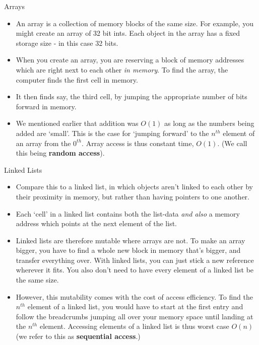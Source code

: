 \documentclass{beamer}
\begin{document}
\begin{frame}{Arrays}
    \begin{itemize}
    \item An array is a collection of memory blocks of the same size. For example, you might create an array of 32 bit ints. Each object in the array has a fixed storage size - in this case 32 bits.
    \pause 
    \item When you create an array, you are reserving a block of memory addresses which are right next to each other \emph{in memory}. To find the array, the computer finds the first cell in memory.
    \item It then finds say, the third cell, by jumping the appropriate number of bits forward in memory.
    \pause   
    \item We mentioned earlier that addition was $O(1)$ as long as the numbers being added are `small'. This is the case for `jumping forward' to the $n^{th}$ element of an array from the $0^{th}$. Array access is thus constant time, $O(1)$. (We call this being \textbf{random access}). 
    \end{itemize}
\end{frame}

\begin{frame}{Linked Lists}
    \begin{itemize}
        \item Compare this to a linked list, in which objects aren't linked to each other by their proximity in memory, but rather than having pointers to one another. 
        \item Each `cell' in a linked list contains both the list-data \emph{and also} a memory address which points at the next element of the list. 
        \pause
        \item Linked lists are therefore mutable where arrays are not. To make an array bigger, you have to find a whole new block in memory that's bigger, and transfer everything over. With linked lists, you can just stick a new reference wherever it fits. You also don't need to have every element of a linked list be the same size. 
        \item However, this mutability comes with the cost of access efficiency. To find the $n^{th}$ element of a linked list, you would have to start at the first entry and follow the breadcrumbs jumping all over your memory space until landing at the $n^{th}$ element. Accessing elements of a linked list is thus worst case $O(n)$ (we refer to this as \textbf{sequential access}.)
    \end{itemize}
\end{frame}
\end{document}
